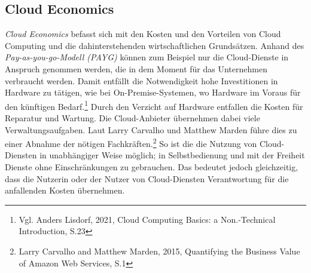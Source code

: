 \subsection{Cloud Economics}\label{subsec_UabsGrund3}
\textit{Cloud Economics} befasst sich mit den Kosten und den Vorteilen von Cloud Computing und die dahinterstehenden wirtschaftlichen Grundsätzen. Anhand des \textit{Pay-as-you-go-Modell (PAYG)} können zum Beispiel nur die Cloud-Dienste in Anspruch genommen werden, die in dem Moment für das Unternehmen verbraucht werden. Damit entfällt die Notwendigkeit hohe Investitionen in Hardware zu tätigen, wie bei On-Premise-Systemen, wo Hardware im Voraus für den künftigen Bedarf.\footnote{Vgl. Anders Lisdorf, 2021, Cloud Computing Basics: a Non.-Technical Introduction, S.23\cite{CCB}} Durch den Verzicht auf Hardware entfallen die Kosten für Reparatur und Wartung. Die Cloud-Anbieter übernehmen dabei viele Verwaltungsaufgaben. Laut Larry Carvalho und Matthew Marden führe dies zu einer Abnahme der nötigen Fachkräften.\footnote{Larry Carvalho and Matthew Marden, 2015, Quantifying the Business Value of Amazon Web Services, S.1\cite{IDC01}} So ist die die Nutzung von Cloud-Diensten in unabhängiger Weise möglich; in Selbstbedienung und mit der Freiheit Dienste ohne Einschränkungen zu gebrauchen. Das bedeutet jedoch gleichzeitig, dass die Nutzerin oder der Nutzer von Cloud-Diensten Verantwortung für die anfallenden Kosten übernehmen.

